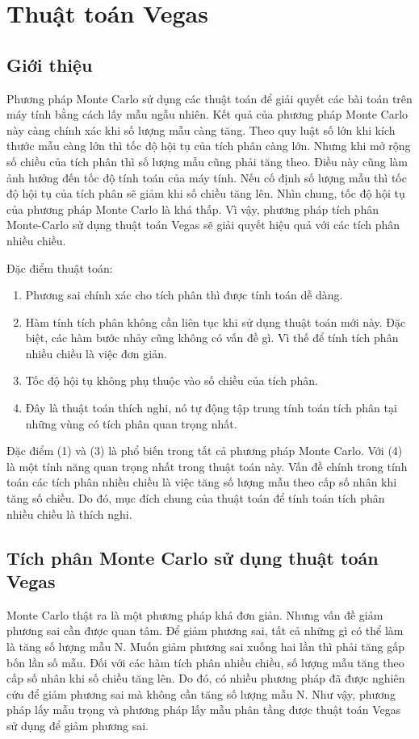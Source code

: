 \chapter{Thuật toán Vegas}\label{ch:3}
\section{Giới thiệu}\label{sec:3.1}
Phương pháp Monte Carlo sử dụng các thuật toán để giải quyết các bài toán trên máy tính bằng cách lấy mẫu ngẫu nhiên. 
Kết quả của phương pháp Monte Carlo này càng chính xác khi số lượng mẫu càng tăng. 
Theo quy luật số lớn khi kích thước mẫu càng lớn thì tốc độ hội tụ của tích phân càng lớn. 
Nhưng khi mở rộng số chiều của tích phân thì số lượng mẫu cũng phải tăng theo. Điều này cũng làm ảnh hưởng đến tốc độ tính toán của máy tính.
Nếu cố định số lượng mẫu thì tốc độ hội tụ của tích phân sẽ giảm khi số chiều tăng lên. Nhìn chung, tốc độ hội tụ của phương pháp Monte Carlo là khá thấp.
Vì vậy, phương pháp tích phân Monte-Carlo sử dụng thuật toán Vegas sẽ giải quyết hiệu quả với các tích phân nhiều chiều.
\par
Đặc điểm thuật toán: 
\begin{enumerate}
      \item Phương sai chính xác cho tích phân thì được tính toán dễ dàng.
      \item Hàm tính tích phân không cần liên tục khi sử dụng thuật toán mới này. Đặc biệt, các hàm bước nhảy cũng không có vấn đề gì. Vì thế để tính tích phân nhiều chiều là việc đơn giản.
      \item Tốc độ hội tụ không phụ thuộc vào số chiều của tích phân.
      \item Đây là thuật toán thích nghi, nó tự động tập trung tính toán tích phân tại những vùng có tích phân quan trọng nhất.
\end{enumerate}
Đặc điểm (1) và (3) là phổ biến trong tất cả phương pháp Monte Carlo. Với (4) là một tính năng quan trọng nhất trong thuật toán này. Vấn đề chính trong tính toán các tích phân nhiều chiều là việc tăng số lượng mẫu theo cấp số nhân khi tăng số chiều. 
Do đó, mục đích chung của thuật toán để tính toán tích phân nhiều chiều là thích nghi.
\section{Tích phân Monte Carlo sử dụng thuật toán Vegas}\label{sec:3.2}
Monte Carlo thật ra là một phương pháp khá đơn giản. Nhưng 
vấn đề giảm phương sai cần được quan tâm. Để giảm phương sai, tất cả những gì có thể làm là tăng số lượng mẫu N. 
Muốn giảm phương sai xuống hai lần thì phải tăng gấp bốn lần số mẫu. Đối với các hàm tích phân nhiều chiều, 
số lượng mẫu tăng theo cấp số nhân khi số chiều tăng lên. Do đó, có nhiều phương pháp đã được nghiên cứu để giảm phương sai mà 
không cần tăng số lượng mẫu N. Như vậy, phương pháp lấy mẫu trọng và phương pháp lấy mẫu phân tầng được thuật toán Vegas sử 
dụng để giảm phương sai.\par

